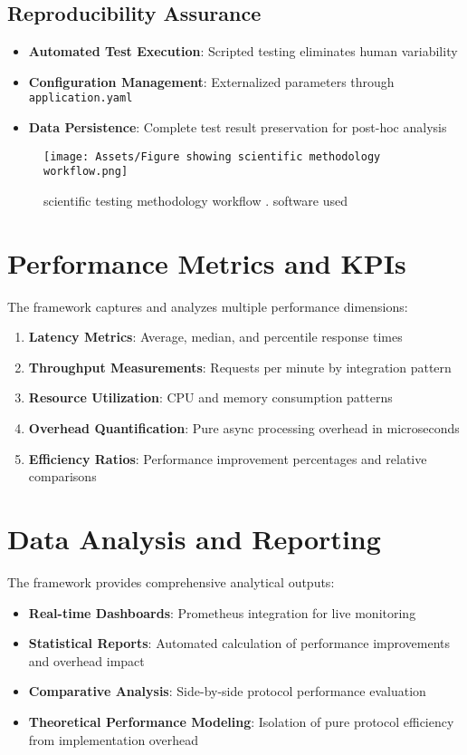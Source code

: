 \subsection{Reproducibility Assurance}

\begin{itemize}
    \item \textbf{Automated Test Execution}: Scripted testing eliminates human variability
    \item \textbf{Configuration Management}: Externalized parameters through \texttt{application.yaml}
    \item \textbf{Data Persistence}: Complete test result preservation for post-hoc analysis
\end{itemize}

\begin{figure}[H]
    \centering
    \texttt{[image: Assets/Figure showing scientific methodology workflow.png]}
    \caption{scientific testing methodology workflow . software used \cite{EraserIO}}
\end{figure}


\section{Performance Metrics and KPIs}

The framework captures and analyzes multiple performance dimensions:

\begin{enumerate}
    \item \textbf{Latency Metrics}: Average, median, and percentile response times
    \item \textbf{Throughput Measurements}: Requests per minute by integration pattern
    \item \textbf{Resource Utilization}: CPU and memory consumption patterns
    \item \textbf{Overhead Quantification}: Pure async processing overhead in microseconds
    \item \textbf{Efficiency Ratios}: Performance improvement percentages and relative comparisons
\end{enumerate}


\section{Data Analysis and Reporting}

The framework provides comprehensive analytical outputs:
\begin{itemize}
    \item \textbf{Real-time Dashboards}: Prometheus integration for live monitoring
    \item \textbf{Statistical Reports}: Automated calculation of performance improvements and overhead impact
    \item \textbf{Comparative Analysis}: Side-by-side protocol performance evaluation
    \item \textbf{Theoretical Performance Modeling}: Isolation of pure protocol efficiency from implementation overhead
\end{itemize}


